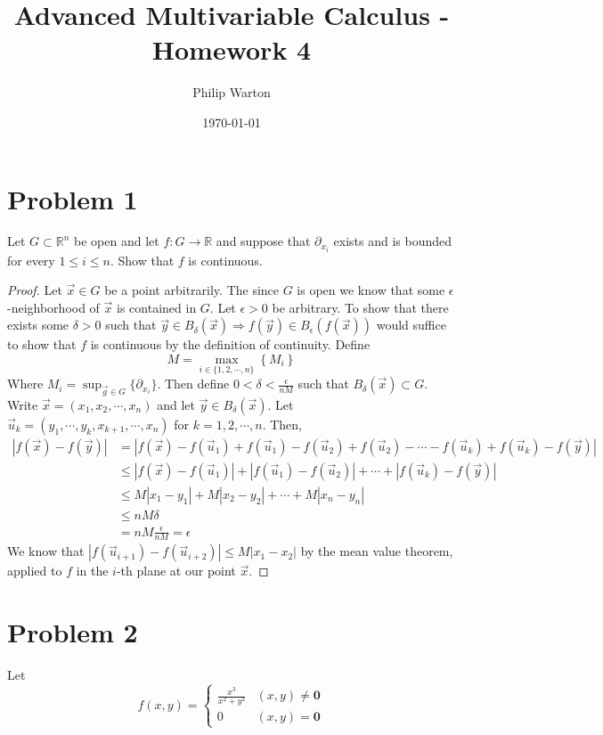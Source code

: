 \documentclass{article}
\theoremstyle{definition}
\begin{document}
\title{Advanced Multivariable Calculus - Homework 4}
\author{Philip Warton}
\date{\today}
\maketitle
\section*{Problem 1}
\begin{mdframed}[]
    Let $G \subset \mathbb{R}^n$ be open and let $f:G \rightarrow \mathbb{R}$ and suppose that 
    $\partial_{x_i}$ exists and is bounded for every $1 \leqslant i \leqslant n$. Show that 
    $f$ is continuous.
\end{mdframed}
\begin{proof}
    Let $\vec x \in G$ be a point arbitrarily.
    The since $G$ is open we know that some $\epsilon$-neighborhood of $\vec x$ is contained in $G$.
    Let $\epsilon > 0$ be arbitrary. To show that there exists some $\delta > 0$ such that 
    $\vec y \in B_\delta(\vec x) \Rightarrow f(\vec y) \in B_\epsilon(f(\vec x))$ would suffice to show that 
    $f$ is continuous by the definition of continuity. Define 
    \[
        M = \max_{i \in \{1,2,\cdots,n\}}\left\{M_i\right\}
    \]
    Where $M_i = \sup_{\vec g \in G}\{\partial_{x_i}\}$. Then define $0 < \delta < \frac{\epsilon}{nM}$ such that $B_\delta(\vec x) \subset G$.
    Write $\vec x = (x_1, x_2, \cdots , x_n)$ and let $\vec y \in B_\delta(\vec x)$. 
    Let $\vec u_k = (y_1, \cdots, y_k, x_{k+1},\cdots,x_n)$ for $k = 1,2,\cdots,n$.
    Then,
    \begin{align*}
        |f(\vec x) - f(\vec y)| &=|f(\vec x) - f(\vec u_1) + f(\vec u_1) - f(\vec u_2) + f(\vec u_2) - \cdots - f(\vec u_k) + f(\vec u_k) - f(\vec y)|\\
        &\leqslant |f(\vec x) - f(\vec u_1)| + |f(\vec u_1) - f(\vec u_2)| + \cdots + |f(\vec u_k) - f(\vec y)|\\
        &\leqslant M|x_1-y_1| + M|x_2 - y_2| + \cdots + M|x_n - y_n| \\
        &\leqslant nM\delta \\
        &= nM\frac{\epsilon}{nM} = \epsilon
    \end{align*}
    We know that $|f(\vec u_{i+1}) - f(\vec u_{i+2})| \leqslant M|x_1 - x_2|$ by the mean value theorem,
    applied to $f$ in the $i$-th plane at our point $\vec x$.
\end{proof}
\section*{Problem 2}
\begin{mdframed}[]
    Let 
    \[
        f(x,y) = \begin{cases}
            \frac{x^3}{x^2 + y^2} & (x,y) \neq \bm 0 \\
            0 & (x,y) = \bm 0
        \end{cases}
    \]
\end{mdframed}
\end{document}
